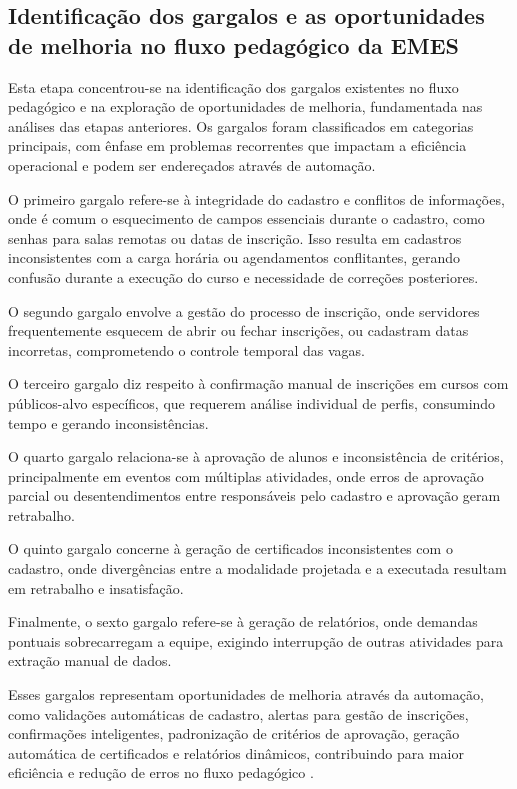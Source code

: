 \subsection{Identificação dos gargalos e as oportunidades de melhoria no fluxo pedagógico da EMES}
\label{sec:metod:etapas:gargalos}

Esta etapa concentrou-se na identificação dos gargalos existentes no
fluxo pedagógico e na exploração de oportunidades de melhoria,
fundamentada nas análises das etapas anteriores. Os gargalos foram
classificados em categorias principais, com ênfase em problemas
recorrentes que impactam a eficiência operacional e podem ser
endereçados através de automação.

O primeiro gargalo refere-se à integridade do cadastro e conflitos de
informações, onde é comum o esquecimento de campos essenciais durante o
cadastro, como senhas para salas remotas ou datas de inscrição. Isso
resulta em cadastros inconsistentes com a carga horária ou
agendamentos conflitantes, gerando confusão durante a execução do curso
e necessidade de correções posteriores.

O segundo gargalo envolve a gestão do processo de inscrição, onde
servidores frequentemente esquecem de abrir ou fechar inscrições, ou
cadastram datas incorretas, comprometendo o controle temporal das
vagas.

O terceiro gargalo diz respeito à confirmação manual de inscrições em
cursos com públicos-alvo específicos, que requerem análise individual
de perfis, consumindo tempo e gerando inconsistências.

O quarto gargalo relaciona-se à aprovação de alunos e inconsistência de
critérios, principalmente em eventos com múltiplas atividades, onde
erros de aprovação parcial ou desentendimentos entre responsáveis pelo
cadastro e aprovação geram retrabalho.

O quinto gargalo concerne à geração de certificados inconsistentes com
o cadastro, onde divergências entre a modalidade projetada e a
executada resultam em retrabalho e insatisfação.

Finalmente, o sexto gargalo refere-se à geração de relatórios, onde
demandas pontuais sobrecarregam a equipe, exigindo interrupção de outras
atividades para extração manual de dados.

Esses gargalos representam oportunidades de melhoria através da
automação, como validações automáticas de cadastro, alertas para gestão
de inscrições, confirmações inteligentes, padronização de critérios de
aprovação, geração automática de certificados e relatórios dinâmicos,
contribuindo para maior eficiência e redução de erros no fluxo
pedagógico \cite{Weske2024}.

